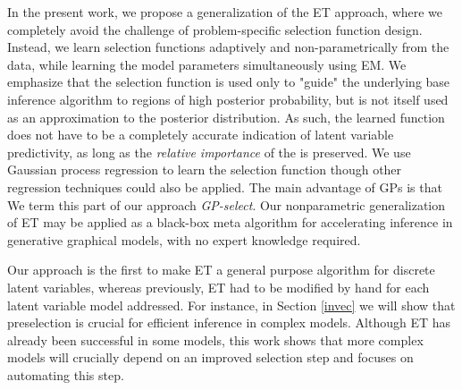 \documentclass[12pt]{article}
\begin{document}
In the present work, we propose a generalization of the ET approach, where
we completely avoid  the challenge of problem-specific selection function design.
Instead, we learn selection functions  adaptively and non-parametrically
from the data,
 while learning the model
parameters  simultaneously using EM.
We emphasize that the selection function is  used only to "guide" the underlying
base inference algorithm to regions of high posterior probability, but is not itself
used as an approximation to the posterior distribution. 
As such, the learned
function does not have to be a completely accurate indication of latent
variable predictivity,
as long as the \emph{relative importance} of the  is preserved.
We use  Gaussian process
regression \citep{RasmussenGPbook} to learn the selection function  though other regression techniques could
also be applied. 
The main advantage of GPs is that 
We term this part of our approach
\textit{GP-select}.
Our nonparametric generalization of  ET may be applied as a black-box
meta algorithm for accelerating inference in  generative graphical models,
with no expert knowledge required.

Our approach is the first to make ET a general purpose algorithm for discrete latent variables,
 whereas previously, ET had to be modified by hand for each latent variable model addressed. 
For instance, in Section \ref{invec} we will show that preselection is crucial for efficient inference in complex models. 
Although ET has already been successful in some models, this work shows that more complex models will crucially depend on an improved selection step and focuses on automating this step.
\end{document}
